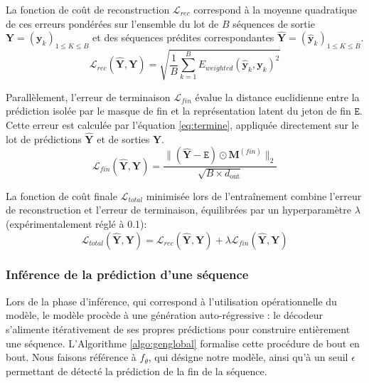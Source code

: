 La fonction de coût de reconstruction $\mathcal{L}_{rec}$ correspond à la moyenne quadratique de ces erreurs pondérées sur l'ensemble du lot de $B$ séquences de sortie $\mathbf{Y} = (\mathbf{y}_k)_{1 \leq K \leq B}$ et des séquences prédites correspondantes $\hat{\mathbf{Y}} = (\mathbf{\hat{y}}_k)_{1 \leq K \leq B}$.\\

\begin{equation}
\label{eq:Lrec}
\mathcal{L}_{rec}(\hat{\mathbf{Y}}, \mathbf{Y}) = \sqrt{\frac{1}{B} \sum_{k=1}^B E_{weighted}(\hat{\mathbf{y}}_k, \mathbf{y}_k)^2}
\end{equation}

Parallèlement, l'erreur de terminaison $\mathcal{L}_{fin}$ évalue la distance euclidienne entre la prédiction isolée par le masque de fin et la représentation latent du jeton de fin $\texttt{E}$. Cette erreur est calculée par l'équation \eqref{eq:termine}, appliquée directement sur le lot de prédictions $\hat{\mathbf{Y}}$ et de sorties $\mathbf{Y}$.
\begin{equation}
\label{eq:termine}
\mathcal{L}_{fin}(\hat{\mathbf{Y}}, \mathbf{Y}) = \frac{\|(\hat{\mathbf{Y}} - \texttt{E}) \odot \mathbf{M}^{(fin)} \|_2}{\sqrt{B \times d_{\text{out}}}}
\end{equation}

La fonction de coût finale $\mathcal{L}_{total}$ minimisée lors de l'entraînement combine l'erreur de reconstruction et l'erreur de terminaison, équilibrées par un hyperparamètre $\lambda$  (expérimentalement réglé à 0.1):
\begin{equation}
\label{eq:Ltot}
\mathcal{L}_{total}(\hat{\mathbf{Y}}, \mathbf{Y}) = \mathcal{L}_{rec}(\hat{\mathbf{Y}}, \mathbf{Y}) + \lambda \mathcal{L}_{fin}(\hat{\mathbf{Y}}, \mathbf{Y})
\end{equation}

\subsubsection{Inférence de la prédiction d'une séquence}
\label{seq:infglob}
Lors de la phase d'inférence, qui correspond à l'utilisation opérationnelle du modèle, le modèle procède à une génération auto-régressive : le décodeur s'alimente itérativement de ses propres prédictions pour construire entièrement une séquence. L'Algorithme \ref{algo:genglobal} formalise cette procédure de bout en bout. Nous faisons référence à $f_{\theta}$, qui désigne notre modèle, ainsi qu'à un seuil $\epsilon$ permettant de détecté la prédiction de la fin de la séquence.\\

